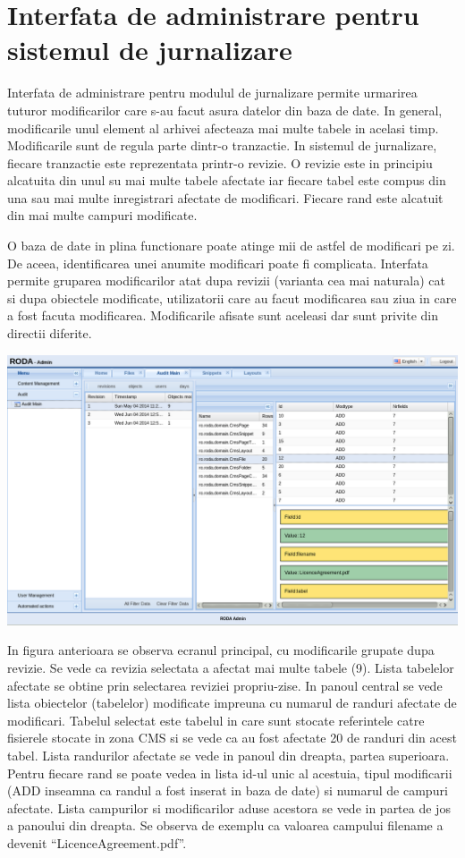 \section{Interfata de administrare pentru sistemul de jurnalizare}

Interfata de administrare pentru modulul de jurnalizare permite urmarirea
tuturor modificarilor care s-au facut asura datelor din baza de date.
In general, modificarile unul element al arhivei afecteaza mai multe
tabele in acelasi timp. Modificarile sunt de regula parte dintr-o
tranzactie. In sistemul de jurnalizare, fiecare tranzactie este reprezentata
printr-o revizie. O revizie este in principiu alcatuita din unul su
mai multe tabele afectate iar fiecare tabel este compus din una sau
mai multe inregistrari afectate de modificari. Fiecare rand este alcatuit
din mai multe campuri modificate. 

O baza de date in plina functionare poate atinge mii de astfel de
modificari pe zi. De aceea, identificarea unei anumite modificari
poate fi complicata. Interfata permite gruparea modificarilor atat
dupa revizii (varianta cea mai naturala) cat si dupa obiectele modificate,
utilizatorii care au facut modificarea sau ziua in care a fost facuta
modificarea. Modificarile afisate sunt aceleasi dar sunt privite din
directii diferite. 

\includegraphics[width=15cm]{audit/audit1}

In figura anterioara se observa ecranul principal, cu modificarile
grupate dupa revizie. Se vede ca revizia selectata a afectat mai multe
tabele (9). Lista tabelelor afectate se obtine prin selectarea reviziei
propriu-zise. In panoul central se vede lista obiectelor (tabelelor)
modificate impreuna cu numarul de randuri afectate de modificari.
Tabelul selectat este tabelul in care sunt stocate referintele catre
fisierele stocate in zona CMS si se vede ca au fost afectate 20 de
randuri din acest tabel. Lista randurilor afectate se vede in panoul
din dreapta, partea superioara. Pentru fiecare rand se poate vedea
in lista id-ul unic al acestuia, tipul modificarii (ADD inseamna ca
randul a fost inserat in baza de date) si numarul de campuri afectate.
Lista campurilor si modificarilor aduse acestora se vede in partea
de jos a panoului din dreapta. Se observa de exemplu ca valoarea campului
filename a devenit ``LicenceAgreement.pdf''.

